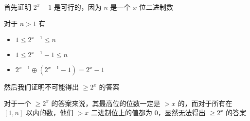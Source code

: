 \begin{frame}

首先证明 $2^x - 1$ 是可行的，因为 $n$ 是一个 $x$ 位二进制数

对于 $n > 1$ 有
\begin{itemize}
    \item $1\leq 2^{x - 1}\leq n$
    \item $1\leq 2^{x - 1} - 1\leq n$
    \item $2^{x - 1} \oplus (2^{x - 1} - 1) = 2^x - 1$
\end{itemize}

然后我们证明不可能得出 $\geq 2^x$ 的答案

对于一个 $\geq 2^x$ 的答案来说，其最高位的位数一定是 $> x$ 的，而对于所有在 $[1, n]$ 以内的数，他们 $>x$ 二进制位上的值都为 $0$，显然无法得出 $\geq 2^x$ 的答案

\end{frame}
